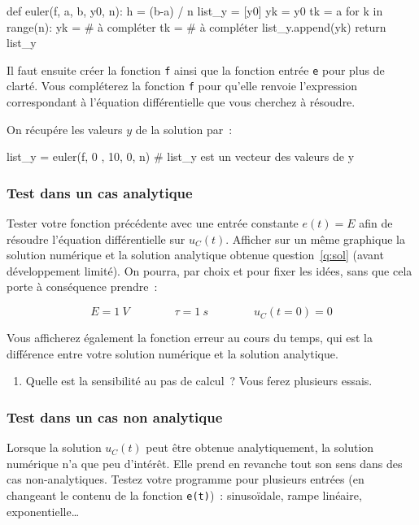 \documentclass[../main/main.tex]{subfiles}
\begin{document}
\begin{python}
	def euler(f, a, b, y0, n):
	h = (b-a) / n
	list_y = [y0]
	yk = y0
	tk = a
	for k in range(n):
	yk = # à compléter
	tk = # à compléter
	list_y.append(yk)
	return list_y
\end{python}

Il faut ensuite créer la fonction \texttt{f} ainsi que la fonction entrée
\texttt{e} pour plus de clarté. Vous compléterez la fonction \texttt{f} pour
qu'elle renvoie l'expression correspondant à l'équation différentielle que vous
cherchez à résoudre.

%
%

On récupére les valeurs $y$ de la solution par~:
\begin{python}
	list_y = euler(f, 0 , 10, 0, n) # list_y est un vecteur des valeurs de y
\end{python}

\subsubsection{Test dans un cas analytique}

Tester votre fonction précédente avec une entrée constante $e(t) = E$ afin de
résoudre l'équation différentielle sur $u_{C}(t)$. Afficher sur un même
graphique la solution numérique et la solution analytique obtenue
question~\ref{q:sol} (avant développement limité). On pourra, par choix et pour
fixer les idées, sans que cela porte à conséquence prendre~:

\[
	E = \SI{1}{V}
	\qquad \qquad
	\tau = \SI{1}{s}
	\qquad \qquad
	u_{C}(t=0) = 0
\]

Vous afficherez également la fonction erreur au cours du temps, qui est la
différence entre votre solution numérique et la solution analytique.
\begin{enumerate}[label=\sqenumi, start=12]
	\item Quelle est la sensibilité au pas de calcul~? Vous ferez plusieurs
	      essais.
\end{enumerate}


\subsubsection{Test dans un cas non analytique}

Lorsque la solution $u_{C}(t)$ peut être obtenue analytiquement, la solution
numérique n'a que peu d'intérêt. Elle prend en revanche tout son sens dans des
cas non-analytiques.
\smallbreak
Testez votre programme pour plusieurs entrées (en changeant le contenu de la
fonction \texttt{e(t)})~: sinusoïdale, rampe linéaire, exponentielle…
\end{document}
